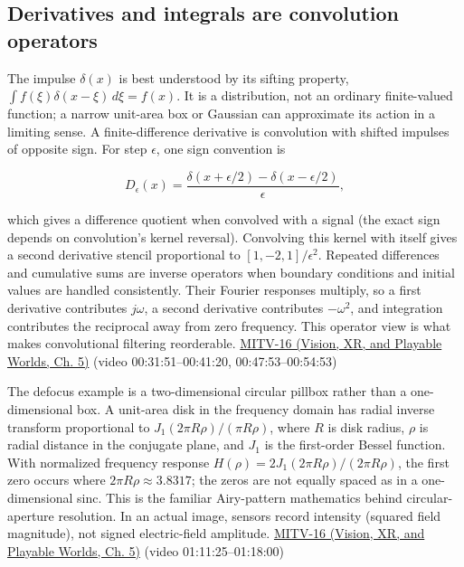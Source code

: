 \subsection{Derivatives and integrals are convolution operators}\label{03-visual-computing-i-ch004-derivatives-and-integrals-are-convolution-operators}

\hypertarget{03-visual-computing-i-ch004-derivatives-and-integrals-are-convolution-operators}{}

The impulse \(\delta(x)\) is best understood by its sifting property, \(\int f(\xi)\delta(x-\xi)\,d\xi=f(x)\). It is a distribution, not an ordinary finite-valued function; a narrow unit-area box or Gaussian can approximate its action in a limiting sense. A finite-difference derivative is convolution with shifted impulses of opposite sign. For step \(\epsilon\), one sign convention is

\[
D_\epsilon(x)=\frac{\delta(x+\epsilon/2)-\delta(x-\epsilon/2)}{\epsilon},
\]

which gives a difference quotient when convolved with a signal (the exact sign depends on convolution's kernel reversal). Convolving this kernel with itself gives a second derivative stencil proportional to \([1,-2,1]/\epsilon^2\). Repeated differences and cumulative sums are inverse operators when boundary conditions and initial values are handled consistently. Their Fourier responses multiply, so a first derivative contributes \(j\omega\), a second derivative contributes \(-\omega^2\), and integration contributes the reciprocal away from zero frequency. This operator view is what makes convolutional filtering reorderable. \href{../07-Vision-XR-and-Playable-Worlds/main.pdf\#nameddest=04-visual-computing-ii-ch036-mitv-16---fast-convolution-low-pass-filter-approximations-integral-images-us-6457032}{MITV-16 (Vision, XR, and Playable Worlds, Ch. 5)} (video 00:31:51--00:41:20, 00:47:53--00:54:53)

The defocus example is a two-dimensional circular pillbox rather than a one-dimensional box. A unit-area disk in the frequency domain has radial inverse transform proportional to \(J_1(2\pi R\rho)/(\pi R\rho)\), where \(R\) is disk radius, \(\rho\) is radial distance in the conjugate plane, and \(J_1\) is the first-order Bessel function. With normalized frequency response \(H(\rho)=2J_1(2\pi R\rho)/(2\pi R\rho)\), the first zero occurs where \(2\pi R\rho\approx3.8317\); the zeros are not equally spaced as in a one-dimensional sinc. This is the familiar Airy-pattern mathematics behind circular-aperture resolution. In an actual image, sensors record intensity (squared field magnitude), not signed electric-field amplitude. \href{../07-Vision-XR-and-Playable-Worlds/main.pdf\#nameddest=04-visual-computing-ii-ch036-mitv-16---fast-convolution-low-pass-filter-approximations-integral-images-us-6457032}{MITV-16 (Vision, XR, and Playable Worlds, Ch. 5)} (video 01:11:25--01:18:00)

